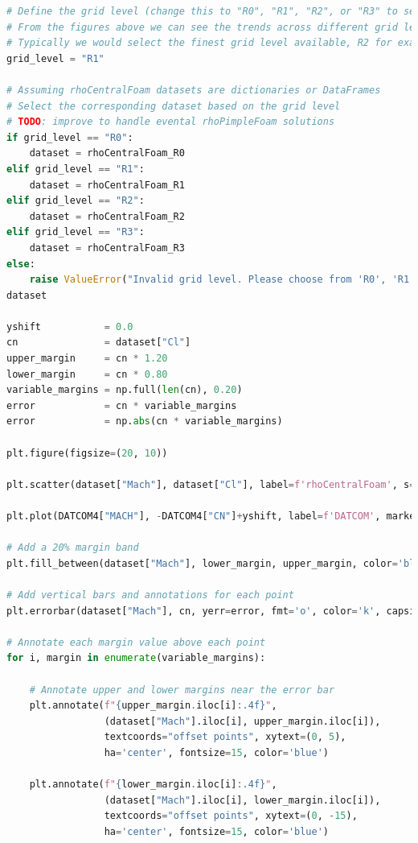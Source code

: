 \documentclass[12pt]{article}
\begin{document}
\begin{lstlisting}[language=Python, caption=Python script used to post-process numerical solutions. To report bugs email to: lorenzo.campoli@gspace.com, label=lst:pp]
# Define the grid level (change this to "R0", "R1", "R2", or "R3" to select the dataset)
# From the figures above we can see the trends across different grid levels
# Typically we would select the finest grid level available, R2 for example
grid_level = "R1" 

# Assuming rhoCentralFoam datasets are dictionaries or DataFrames
# Select the corresponding dataset based on the grid level
# TODO: improve to handle evental rhoPimpleFoam solutions
if grid_level == "R0":
    dataset = rhoCentralFoam_R0
elif grid_level == "R1":
    dataset = rhoCentralFoam_R1
elif grid_level == "R2":
    dataset = rhoCentralFoam_R2
elif grid_level == "R3":
    dataset = rhoCentralFoam_R3
else:
    raise ValueError("Invalid grid level. Please choose from 'R0', 'R1', 'R2', or 'R3'.")
dataset

yshift           = 0.0
cn               = dataset["Cl"]
upper_margin     = cn * 1.20  
lower_margin     = cn * 0.80  
variable_margins = np.full(len(cn), 0.20)
error            = cn * variable_margins 
error            = np.abs(cn * variable_margins) 

plt.figure(figsize=(20, 10))

plt.scatter(dataset["Mach"], dataset["Cl"], label=f'rhoCentralFoam', s=200, marker='p', color='b', linestyle='dotted')

plt.plot(DATCOM4["MACH"], -DATCOM4["CN"]+yshift, label=f'DATCOM', marker='p', linestyle=':', color='gray')

# Add a 20% margin band
plt.fill_between(dataset["Mach"], lower_margin, upper_margin, color='blue', alpha=0.2, label='20% Margin Band')

# Add vertical bars and annotations for each point
plt.errorbar(dataset["Mach"], cn, yerr=error, fmt='o', color='k', capsize=10, label='Local Margin')

# Annotate each margin value above each point
for i, margin in enumerate(variable_margins):
    
    # Annotate upper and lower margins near the error bar
    plt.annotate(f"{upper_margin.iloc[i]:.4f}", 
                 (dataset["Mach"].iloc[i], upper_margin.iloc[i]), 
                 textcoords="offset points", xytext=(0, 5),
                 ha='center', fontsize=15, color='blue')
    
    plt.annotate(f"{lower_margin.iloc[i]:.4f}", 
                 (dataset["Mach"].iloc[i], lower_margin.iloc[i]), 
                 textcoords="offset points", xytext=(0, -15),
                 ha='center', fontsize=15, color='blue')


\end{lstlisting}
\end{document}
